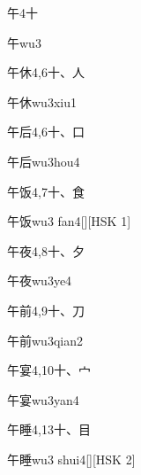 \begin{Entry}{午}{4}{⼗}
  \begin{Phonetics}{午}{wu3}
  \end{Phonetics}
\end{Entry}

\begin{Entry}{午休}{4,6}{⼗、⼈}
  \begin{Phonetics}{午休}{wu3xiu1}
  \end{Phonetics}
\end{Entry}

\begin{Entry}{午后}{4,6}{⼗、⼝}
  \begin{Phonetics}{午后}{wu3hou4}
  \end{Phonetics}
\end{Entry}

\begin{Entry}{午饭}{4,7}{⼗、⾷}
  \begin{Phonetics}{午饭}{wu3 fan4}[][HSK 1]
  \end{Phonetics}
\end{Entry}

\begin{Entry}{午夜}{4,8}{⼗、⼣}
  \begin{Phonetics}{午夜}{wu3ye4}
  \end{Phonetics}
\end{Entry}

\begin{Entry}{午前}{4,9}{⼗、⼑}
  \begin{Phonetics}{午前}{wu3qian2}
  \end{Phonetics}
\end{Entry}

\begin{Entry}{午宴}{4,10}{⼗、⼧}
  \begin{Phonetics}{午宴}{wu3yan4}
  \end{Phonetics}
\end{Entry}

\begin{Entry}{午睡}{4,13}{⼗、⽬}
  \begin{Phonetics}{午睡}{wu3 shui4}[][HSK 2]
  \end{Phonetics}
\end{Entry}

